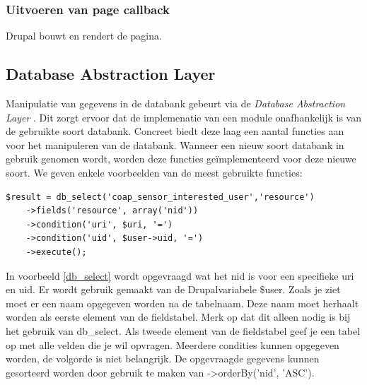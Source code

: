 \subsubsection{Uitvoeren van page callback}
Drupal bouwt en rendert de pagina.

\subsection{Database Abstraction Layer}
Manipulatie van gegevens in de databank gebeurt via de \textit{Database Abstraction Layer} \cite{databaseAbstractionLayer}. Dit zorgt ervoor dat de implemenatie van een module onafhankelijk is van de gebruikte soort databank. Concreet biedt deze laag een aantal functies aan voor het manipuleren van de databank. Wanneer een nieuw soort databank in gebruik genomen wordt, worden deze functies ge\"{i}mplementeerd voor deze nieuwe soort. We geven enkele voorbeelden van de meest gebruikte functies:
\lstset{language=PHP}
\begin{lstlisting}[label=db_select,caption=Voorbeeld gebruik van db\_select]
$result = db_select('coap_sensor_interested_user','resource')
	->fields('resource', array('nid'))
	->condition('uri', $uri, '=')
	->condition('uid', $user->uid, '=')
	->execute();
\end{lstlisting}
In voorbeeld \ref{db_select} wordt opgevraagd wat het nid is voor een specifieke uri en uid. Er wordt gebruik gemaakt van de Drupalvariabele \$user. Zoals je ziet moet er een naam opgegeven worden na de tabelnaam. Deze naam moet herhaalt worden als eerste element van de fieldstabel. Merk op dat dit alleen nodig is bij het gebruik van db\_select. Als tweede element van de fieldstabel geef je een tabel op met alle velden die je wil opvragen. Meerdere condities kunnen opgegeven worden, de volgorde is niet belangrijk. De opgevraagde gegevens kunnen gesorteerd worden door gebruik te maken van -\textgreater orderBy('nid', 'ASC').\\

